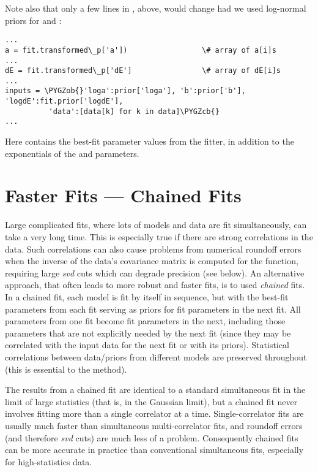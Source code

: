 \documentclass[letterpaper,10pt,english]{sphinxmanual}
\def\PYGZob{\char`\{}
\def\PYGZcb{\char`\}}
\begin{document}
Note also that only a few lines in , above,
would change had we used log-normal priors for  and :

\begin{Verbatim}[commandchars=\\\{\}]
...
a = fit.transformed\_p['a'])                 \# array of a[i]s
...
dE = fit.transformed\_p['dE']                \# array of dE[i]s
...
inputs = \PYGZob{}'loga':prior['loga'], 'b':prior['b'], 'logdE':fit.prior['logdE'],
          'data':[data[k] for k in data]\PYGZcb{}
...
\end{Verbatim}

Here  contains the best-fit parameter values from the
fitter, in addition to the exponentials of the  and 
parameters.


\section{Faster Fits --- Chained Fits}
\label{corrfitter:chained-fits}\label{corrfitter:faster-fits-chained-fits}
Large complicated fits, where lots of models and data are fit simultaneously,
can  take a very long time. This is especially true if there are strong
correlations in the data. Such correlations can also cause  problems from
numerical roundoff errors when the inverse of the data's covariance matrix is
computed for the  function, requiring large \emph{svd} cuts which can
degrade precision (see below). An alternative approach, that often leads to
more robust and faster fits, is to used \emph{chained} fits.  In a chained fit,
each model is fit by itself in sequence, but with the best-fit parameters from
each fit serving as priors for fit parameters in  the next fit. All parameters
from one fit become fit parameters in the next, including those parameters
that are  not explicitly needed by the next fit (since they may be correlated
with the input data for the next fit or with its priors). Statistical
correlations between data/priors from different models are preserved
throughout (this is essential to the method).

The results from a chained fit are identical to a standard simultaneous fit in
the limit of large statistics (that is, in the Gaussian limit), but a  chained
fit never involves fitting more than a single correlator at a time.
Single-correlator fits are usually much faster than simultaneous multi-correlator
fits, and roundoff errors (and therefore \emph{svd} cuts) are much less of a
problem. Consequently chained fits can be more accurate in practice than
conventional simultaneous fits, especially for high-statistics data.
\end{document}
